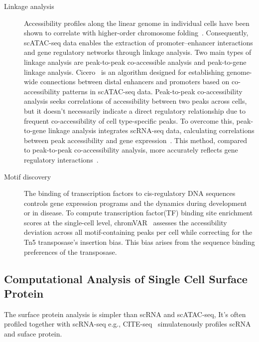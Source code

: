 \begin{description}
	\item[Linkage analysis]
	Accessibility profiles along the linear genome in individual cells have been shown to correlate with higher-order chromosome folding~\citep{Buenrostro2015}. Consequently, scATAC-seq data enables the extraction of promoter–enhancer interactions and gene regulatory networks through linkage analysis. Two main types of linkage analysis are peak-to-peak co-accessible analysis and peak-to-gene linkage analysis. Cicero~\citep{pliner2018cicero} is an algorithm designed for establishing genome-wide connections between distal enhancers and promoters based on co-accessibility patterns in scATAC-seq data. Peak-to-peak co-accessibility analysis seeks correlations of accessibility between two peaks across cells, but it doesn't necessarily indicate a direct regulatory relationship due to frequent co-accessibility of cell type-specific peaks. To overcome this, peak-to-gene linkage analysis integrates scRNA-seq data, calculating correlations between peak accessibility and gene expression~\citep{Granja2021}. This method, compared to peak-to-peak co-accessibility analysis, more accurately reflects gene regulatory interactions~\citep{shi2022scatacoverview}.

	\item[Motif discovery]
	The binding of transcription factors to cis-regulatory DNA sequences controls gene expression programs and the dynamics during development or in disease. To compute transcription factor(TF) binding site enrichment scores at the single-cell level, chromVAR~\citep{schep2017chromvar} assesses the accessibility deviation across all motif-containing peaks per cell while correcting for the Tn5 transposase's insertion bias. This bias arises from the sequence binding preferences of the transposase.

\end{description}

\subsection{Computational Analysis of Single Cell Surface Protein}
\label{background:sec2:protein}
The surface protein analysis is simpler than scRNA and scATAC-seq, It's often profiled together with scRNA-seq e.g., CITE-seq~\citep{citeseq2017} simulatenously profiles scRNA and suface protein.

